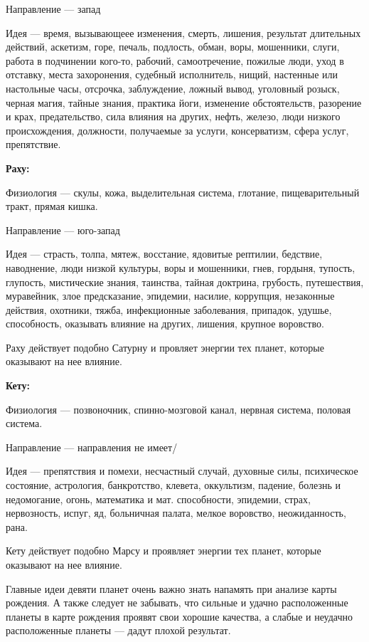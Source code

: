 \begin{myenum}[topsep=0]
\begin{mydescr}
			\item[Направление] --- запад
			\item[Идея] --- время, вызывающеее изменения, смерть, лишения, результат длительных действий, аскетизм, горе, печаль, подлость, обман, воры, мошенники, слуги, работа в подчинении кого-то, рабочий, самоотречение, пожилые люди, уход в отставку, места захоронения, судебный исполнитель, нищий, настенные или настольные часы, отсрочка, заблуждение, ложный вывод, уголовный розыск, черная магия, тайные знания, практика йоги, изменение обстоятельств, разорение и крах, предательство, сила влияния на других, нефть, железо, люди низкого происхождения, должности, получаемые за услуги, консерватизм, сфера услуг, препятствие.
		\end{mydescr}
	\item \textbf{Раху:}
		\begin{mydescr}
			\item[Физиология] --- скулы, кожа, выделительная система, глотание, пищеварительный тракт, прямая кишка.
			\item[Направление] --- юго-запад
			\item[Идея] --- страсть, толпа, мятеж, восстание, ядовитые рептилии, бедствие, наводнение, люди низкой культуры, воры и мошенники, гнев, гордыня, тупость, глупость, мистические знания, таинства, тайная доктрина, грубость, путешествия, муравейник, злое предсказание, эпидемии, насилие, коррупция, незаконные действия, охотники, тяжба, инфекционные заболевания, припадок, удушье, способность, оказывать влияние на других, лишения, крупное воровство.

Раху действует подобно Сатурну и провляет энергии тех планет, которые оказывают на нее влияние.
		\end{mydescr}
	\item \textbf{Кету:}
		\begin{mydescr}
			\item[Физиология] --- позвоночник, спинно-мозговой канал, нервная система, половая система.
			\item[Направление] --- направления не имеет/
			\item[Идея] --- препятствия и помехи, несчастный случай, духовные силы, психическое состояние, астрология, банкротство, клевета, оккультизм, падение, болезнь и недомогание, огонь, математика и мат. способности, эпидемии, страх, нервозность, испуг, яд, больничная палата, мелкое воровство, неожиданность, рана.

Кету действует подобно Марсу и проявляет энергии тех планет, которые оказывают на нее влияние.
		\end{mydescr}
\end{myenum}

Главные идеи девяти планет очень важно знать напамять при анализе карты рождения. А также следует не забывать, что сильные и удачно расположенные планеты в карте рождения проявят свои хорошие качества, а слабые и неудачно расположенные планеты --- дадут плохой результат.
